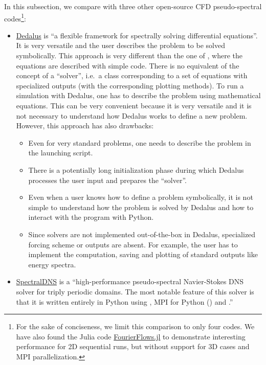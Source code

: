 In this subsection, we compare  with three other open-source CFD
pseudo-spectral codes\footnote{For the sake of conciseness, we limit this
comparison to only four codes. We have also found the Julia code
\href{https://github.com/FourierFlows/FourierFlows.jl}{FourierFlows.jl} to
demonstrate interesting performance for 2D sequential runs, but without support
for 3D cases and MPI parallelization.}:
\begin{itemize}
\item \href{http://dedalus-project.org/}{Dedalus} \citep{burns_dedalus} is ``a
flexible framework for spectrally solving differential equations''. It is very
versatile and the user describes the problem to be solved symbolically.
%
This approach is very different than the one of , where the
equations are described with simple \Numpy code.  There is no equivalent of the
 concept of a ``solver'', i.e.\ a class corresponding to a set of
equations with specialized outputs (with the corresponding plotting methods).  To
run a simulation with Dedalus, one has to describe the problem using mathematical
equations.  This can be very convenient because it is very versatile and it is not
necessary to understand how Dedalus works to define a new problem. However, this
approach has also drawbacks:
\begin{itemize}
\item Even for very standard problems, one needs to describe the problem in the
launching script.
\item There is a potentially long initialization phase during which Dedalus
processes the user input and prepares the ``solver''.
\item Even when a user knows how to define a problem symbolically, it is not
simple to understand how the problem is solved by Dedalus and how to interact with
the program with Python.
\item Since solvers are not implemented out-of-the-box in Dedalus,
specialized forcing scheme or outputs are absent. For example, the user has to
implement the computation, saving and plotting of standard outputs like energy
spectra.
\end{itemize}

\item \href{https://github.com/spectralDNS/spectralDNS}{SpectralDNS}
\citep{mortensen_spectraldns2016} is a ``high-performance pseudo-spectral
Navier-Stokes DNS solver for triply periodic domains. The most notable feature of
this solver is that it is written entirely in Python using \Numpy, MPI
for Python () and .''


\end{itemize}
